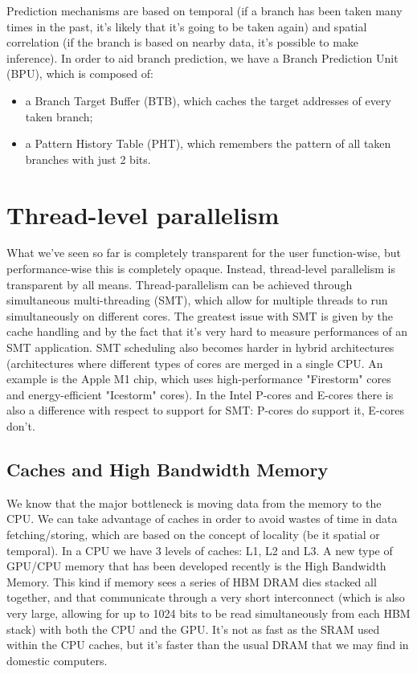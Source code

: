 Prediction mechanisms are based on temporal (if a branch has been taken many times in the past, it's likely that it's going to be taken again) and spatial correlation (if the branch is based on nearby data, it's possible to make inference).
\nwl
In order to aid branch prediction, we have a Branch Prediction Unit (BPU), which is composed of:
\begin{itemize}
    \item a Branch Target Buffer (BTB), which caches the target addresses of every taken branch;
    \item a Pattern History Table (PHT), which remembers the pattern of all taken branches with just 2 bits. 
\end{itemize}

\section{Thread-level parallelism}

What we've seen so far is completely transparent for the user function-wise, but performance-wise this is completely opaque. Instead, thread-level parallelism is transparent by all means. 
\nwl
Thread-parallelism can be achieved through simultaneous multi-threading (SMT), which allow for multiple threads to run simultaneously on different cores. The greatest issue with SMT is given by the cache handling and by the fact that it's very hard to measure performances of an SMT application.
\nwl
SMT scheduling also becomes harder in hybrid architectures (architectures where different types of cores are merged in a single CPU. An example is the Apple M1 chip, which uses high-performance "Firestorm" cores and energy-efficient "Icestorm" cores). In the Intel P-cores and E-cores there is also a difference with respect to support for SMT: P-cores do support it, E-cores don't.

\subsection{Caches and High Bandwidth Memory}

We know that the major bottleneck is moving data from the memory to the CPU. We can take advantage of caches in order to avoid wastes of time in data fetching/storing, which are based on the concept of locality (be it spatial or temporal). In a CPU we have 3 levels of caches: L1, L2 and L3.
\nwl
A new type of GPU/CPU memory that has been developed recently is the High Bandwidth Memory. This kind if memory sees a series of HBM DRAM dies stacked all together, and that communicate through a very short interconnect (which is also very large, allowing for up to 1024 bits to be read simultaneously from each HBM stack) with both the CPU and the GPU. It's not as fast as the SRAM used within the CPU caches, but it's faster than the usual DRAM that we may find in domestic computers.